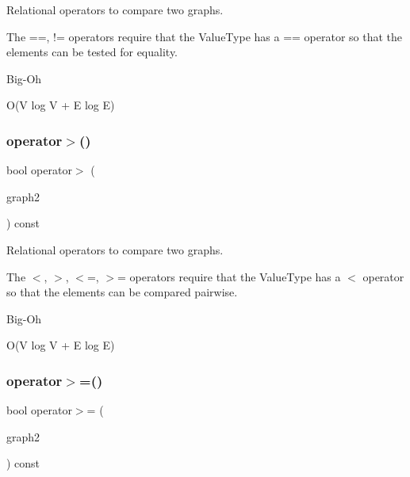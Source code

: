Relational operators to compare two graphs. 

The ==, != operators require that the Value\+Type has a == operator so that the elements can be tested for equality. \begin{DoxyRefDesc}{Big-\/\+Oh}
\item[\mbox{\hyperlink{BigOh__BigOh000093}{Big-\/\+Oh}}]O(V log V + E log E) \end{DoxyRefDesc}
\mbox{\label{classGraph_a8019cf2c98949fd509193cf26ba2ff8a}} 
\subsubsection{\texorpdfstring{operator$>$()}{operator>()}}
{\footnotesize\ttfamily bool operator$>$ (\begin{DoxyParamCaption}\item[{const \mbox{\hyperlink{classGraph}{Graph}}$<$ \mbox{\hyperlink{classVertexGen}{Vertex\+Gen}}$<$ V, E $>$, Edge\+Gen$<$ V, E $>$ $>$ \&}]{graph2 }\end{DoxyParamCaption}) const\hspace{0.3cm}{\ttfamily [inherited]}}



Relational operators to compare two graphs. 

The $<$, $>$, $<$=, $>$= operators require that the Value\+Type has a $<$ operator so that the elements can be compared pairwise. \begin{DoxyRefDesc}{Big-\/\+Oh}
\item[\mbox{\hyperlink{BigOh__BigOh000097}{Big-\/\+Oh}}]O(V log V + E log E) \end{DoxyRefDesc}
\mbox{\label{classGraph_ab1ca2af20f3b0251972b72295270212e}} 
\subsubsection{\texorpdfstring{operator$>$=()}{operator>=()}}
{\footnotesize\ttfamily bool operator$>$= (\begin{DoxyParamCaption}\item[{const \mbox{\hyperlink{classGraph}{Graph}}$<$ \mbox{\hyperlink{classVertexGen}{Vertex\+Gen}}$<$ V, E $>$, Edge\+Gen$<$ V, E $>$ $>$ \&}]{graph2 }\end{DoxyParamCaption}) const\hspace{0.3cm}{\ttfamily [inherited]}}



